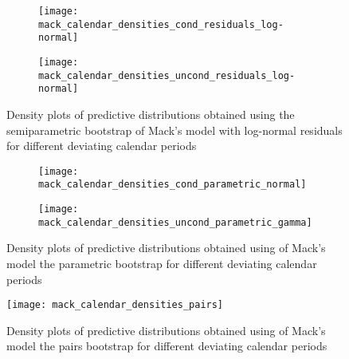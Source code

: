 \documentclass[a4paper]{book}
\begin{document}
\begin{landscape}
  \begin{figure}
    \begin{subfigure}{0.5\linewidth}
      \centering
      \texttt{[image: mack\_calendar\_densities\_cond\_residuals\_log-normal]}
      \label{fig:mack-calendar-cond-semiparam-log-normal}
    \end{subfigure}
    \begin{subfigure}{0.5\linewidth}
      \centering
      \texttt{[image: mack\_calendar\_densities\_uncond\_residuals\_log-normal]}
      \label{fig:mack-calendar-uncond-semiparam-log-normal}
    \end{subfigure}
    \caption{Density plots of predictive distributions obtained using the semiparametric bootstrap of Mack's model with log-normal residuals for different deviating calendar periods}
  \end{figure}
\end{landscape}

\begin{landscape}
  \begin{figure}
    \begin{subfigure}{0.5\linewidth}
      \centering
      \texttt{[image: mack\_calendar\_densities\_cond\_parametric\_normal]}
      \label{fig:mack-calendar-cond-param-normal}
    \end{subfigure}
    \begin{subfigure}{0.5\linewidth}
      \centering
      \texttt{[image: mack\_calendar\_densities\_uncond\_parametric\_gamma]}
      \label{fig:mack-calendar-uncond-param-gamma}
    \end{subfigure}
    \caption{Density plots of predictive distributions obtained using of Mack's model the parametric bootstrap for different deviating calendar periods}
  \end{figure}
\end{landscape}

\begin{landscape}
  \begin{figure}
    \centering
    \texttt{[image: mack\_calendar\_densities\_pairs]}
    \caption{Density plots of predictive distributions obtained using of Mack's model the pairs bootstrap for different deviating calendar periods}
    \label{fig:mack-calendar-pairs}
  \end{figure}
\end{landscape}
\end{document}
